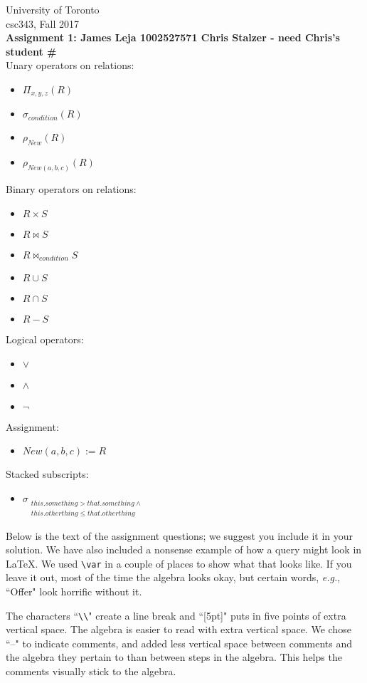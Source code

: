 \documentclass{article}
\newcommand{\var}[1]{\mathit{#1}}
\begin{document}
\noindent
University of Toronto\\
{\sc csc}343, Fall 2017\\[10pt]
{\LARGE\bf Assignment 1: James Leja 1002527571 Chris Stalzer - need Chris's student \#} \\[10pt]

\noindent
Unary operators on relations:
\begin{itemize}
\item $\Pi_{x, y, z} (R)$
\item $\sigma_{condition} (R) $
\item $\rho_{New} (R) $
\item $\rho_{New(a, b, c)} (R) $
\end{itemize}
Binary operators on relations:
\begin{itemize}
\item $R \times S$
\item $R \bowtie S$
\item $R \bowtie_{condition} S$
\item $R \cup S$
\item $R \cap S$
\item $R - S$
\end{itemize}
Logical operators:
\begin{itemize}
\item $\vee$
\item $\wedge$
\item $\neg$
\end{itemize}
Assignment:
\begin{itemize}
\item $New(a, b, c) := R$
\end{itemize}
Stacked subscripts:
\begin{itemize}
\item
$\sigma_{\substack{this.something > that.something \wedge \\ this.otherthing \leq that.otherthing}}$
\end{itemize}

\noindent
Below is the text of the assignment questions; we suggest you include it in your solution.
We have also included a nonsense example of how a query might look in LaTeX.  
We used \verb|\var| in a couple of places to show what that looks like.  
If you leave it out, most of the time the algebra looks okay, but certain words,
{\it e.g.}, ``Offer" look horrific without it.

The characters ``\verb|\\|" create a line break and ``[5pt]" puts in 
five points of extra vertical space.  The algebra is easier to read with extra
vertical space.
We chose ``--" to indicate comments, and added less vertical space between comments
and the algebra they pertain to than between steps in the algebra.
This helps the comments visually stick to the algebra.
\end{document}
